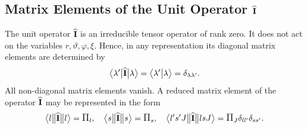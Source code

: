 \subsection{Matrix Elements of the Unit Operator \(\widehat{\mathbf{I}}\)}\label{sec:13.2.2}
The unit operator \(\widehat{\mathbf{I}}\) is an irreducible tensor operator of rank zero. It does not act on the variables \(r, \vartheta, \varphi, \xi\). Hence, in any representation its diagonal matrix elements are determined by
\begin{equation}
\bigl\langle \lambda^{\prime} \big|  \widehat{\mathbf{I}} \big| \lambda \bigr\rangle=
\bigl\langle \lambda^{\prime} \big| \lambda \bigr\rangle=\delta_{\lambda \lambda^{\prime}}. \label{eq:13:2:8}
\end{equation}
All non-diagonal matrix elements vanish. A reduced matrix element of the operator \(\widehat{\mathbf{I}}\) may be represented in the form
\begin{equation}
\braOketred{l}{\widehat{\vect{I}}}{l}=\Fact{l}, \quad\braOketred{s}{\widehat{\vect{I}}}{s}=\Fact{s}, \quad
\braOketred{ l^{\prime} s^{\prime} J}{\widehat{\vect{I}}}{ l s J}=\Fact{J} \delta_{l l^{\prime}} \delta_{s s^{\prime}}. \label{eq:13:2:9}
\end{equation}
